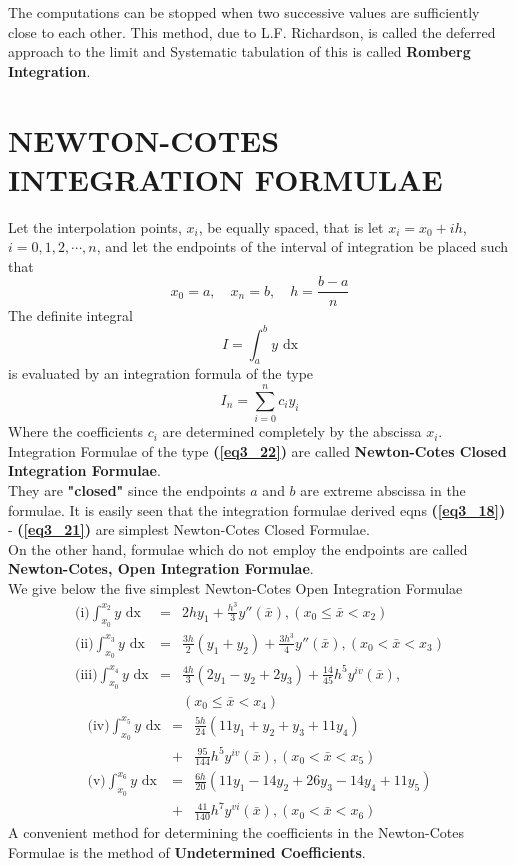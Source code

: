 \documentclass[12pt]{report}
\newcommand{\sps}{\\[0.2cm]}
\newcommand{\refn}[1]{\textbf{(\ref{#1})}}
\newcommand{\bt}[1]{\textbf{#1}}
\newcommand{\dprime}{''}
\begin{document}
	The computations can be stopped when two successive values are sufficiently close to each other. This method, due to L.F. Richardson, is called the deferred approach to the limit and Systematic tabulation of this is called \bt{Romberg Integration}.
	
	\section{NEWTON-COTES INTEGRATION FORMULAE}
	Let the interpolation points, $x_i$, be equally spaced, that is let $x_i = x_0 + ih$, $i=0,1,2,\cdots,n$, and let the endpoints of the interval of integration be placed such that
	$$
		x_0 = a, \quad x_n = b, \quad h = \frac{b-a}{n}
	$$
	The definite integral
	\begin{equation}
		I = \int_{a}^{b}y\text{ dx}
		\label{eq3_21}
	\end{equation}
	is evaluated by an integration formula of the type
	\begin{equation}
		I_n = \sum_{i=0}^{n} c_iy_i
		\label{eq3_22}
	\end{equation}
	Where the coefficients $c_i$ are determined completely by the abscissa $x_i$. Integration Formulae of the type \refn{eq3_22} are called \bt{Newton-Cotes Closed Integration Formulae}.\sps
	They are \bt{"closed"} since the endpoints $a$ and $b$ are extreme abscissa in the formulae. It is easily seen that the integration formulae derived eqns \refn{eq3_18} - \refn{eq3_21} are simplest Newton-Cotes Closed Formulae.\sps
	On the other hand, formulae which do not employ the endpoints are called \bt{Newton-Cotes, Open Integration Formulae}.\sps
	We give below the five simplest Newton-Cotes Open Integration Formulae
	\begin{eqnarray}
		\text{(i)}  \int_{x_0}^{x_2}y\text{ dx} &=& 2hy_1 + \frac{h^3}{3}y\dprime(\bar{x}), (x_0 \leq \bar{x} < x_2)\\[1cm]
		\text{(ii)}  \int_{x_0}^{x_3}y\text{ dx} &=& \frac{3h}{2}(y_1 + y_2)+ \frac{3h^3}{4}y\dprime(\bar{x}), (x_0 < \bar{x} < x_3)\\[1cm]
		\text{(iii)}  \int_{x_0}^{x_4}y\text{ dx} &=& \frac{4h}{3}(2y_1 - y_2 + 2y_3)+\frac{14}{45}h^5y^{iv}(\bar{x}),\nonumber\\
		& &(x_0 \leq \bar{x} < x_4)
	\end{eqnarray}
	\newpage
	\begin{eqnarray}
		\text{(iv)}  \int_{x_0}^{x_5}y\text{ dx} &=& \frac{5h}{24}(11y_1 + y_2 + y_3 + 11y_4)\nonumber\\
		&+&\frac{95}{144}h^5y^{iv}(\bar{x}), (x_0 < \bar{x} < x_5) \\[1cm]
		\text{(v)}  \int_{x_0}^{x_6}y\text{ dx} &=& \frac{6h}{20}(11y_1-14y_2+26y_3-14y_4+11y_5)\nonumber\\
		&+& \frac{41}{140}h^7y^{vi}(\bar{x}),(x_0 < \bar{x} < x_6)
	\end{eqnarray}
	A convenient method for determining the coefficients in the Newton-Cotes Formulae is the method of \bt{Undetermined Coefficients}.
	
\end{document}

